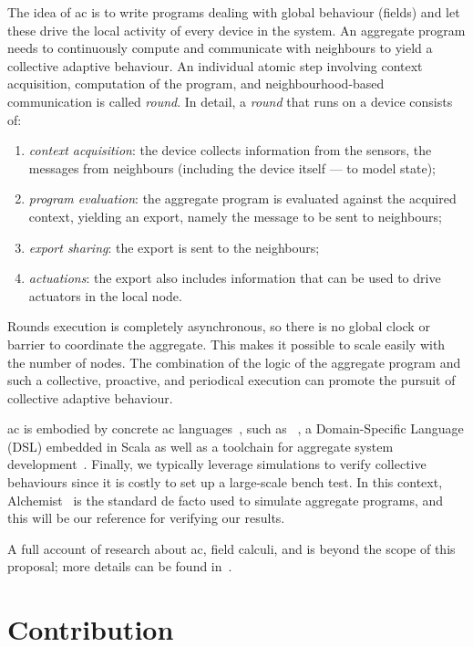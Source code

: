 \documentclass[11pt]{article}
\begin{document}
The idea of \ac{ac} is to write programs dealing with global behaviour (fields) and let these drive the local activity of every device in the system.
%
An aggregate program needs to continuously compute and communicate with neighbours to yield a collective adaptive behaviour.
%
An individual atomic step involving context acquisition, computation of the program, and neighbourhood-based communication is called \emph{round}.
%
In detail, a \emph{round} that runs on a device consists of:
\begin{enumerate}
  \item \emph{context acquisition}: the device collects information from the sensors, the messages from neighbours (including the device itself --- to model state);
  \item \emph{program evaluation}: the aggregate program is evaluated against the acquired context, yielding an export, namely the message to be sent to neighbours;
  \item \emph{export sharing}: the export is sent to the neighbours;
  \item \emph{actuations}: the export also includes information that can be used to drive actuators in the local node.
\end{enumerate}
%
Rounds execution is completely asynchronous, so there is no global clock or barrier to coordinate the aggregate. 
%
This makes it possible to scale easily with the number of nodes. 
%
The combination of the logic of the aggregate program and such a collective, proactive, and periodical execution can promote the pursuit of collective adaptive behaviour.

\ac{ac} is embodied by concrete \ac{ac} languages~\cite{viroli2019jlamp-si-coord},
 such as \scafi{}~\cite{DBLP:conf/isola/CasadeiVAD20,DBLP:journals/eaai/CasadeiVAPD21},
 a Domain-Specific Language (DSL) embedded in Scala
 as well as a toolchain for aggregate system development~\cite{Casadei2016mass}.
%
Finally, we typically leverage simulations to verify collective behaviours since it is costly to set up a large-scale bench test. 
%
In this context, Alchemist~\cite{Pianini_2013} is the standard de facto used to simulate aggregate programs, and this will be our reference for verifying our results.

A full account of research about \ac{ac}, field calculi, and \scafi{} is beyond the scope of this proposal; more details can be found in~\cite{viroli2019jlamp-si-coord,DBLP:journals/eaai/CasadeiVAPD21}.

\section{Contribution} \label{contribution}
\end{document}
